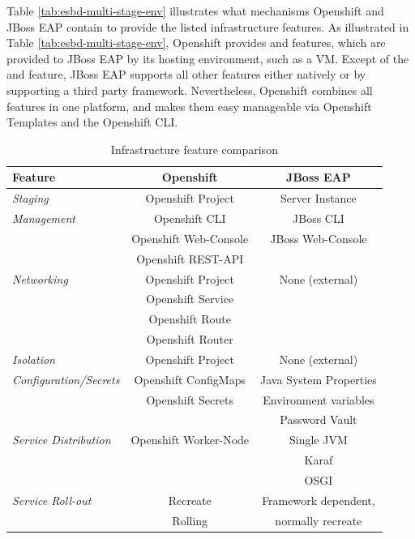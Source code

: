 Table \vref{tab:esbd-multi-stage-env} illustrates what mechanisms Openshift and JBoss EAP contain to provide the listed infrastructure features. As illustrated in Table \vref{tab:esbd-multi-stage-env}, Openshift provides  and  features, which are provided to JBoss EAP by its hosting environment, such as a VM. Except of the  and  feature, JBoss EAP supports all other features either natively or by supporting a third party framework. Nevertheless, Openshift combines all features in one platform, and makes them easy manageable via Openshift Templates and the Openshift CLI.

{\renewcommand{\arraystretch}{1.2}%
\begin{table}[h]
	\begin{tabularx}{\textwidth}{ X|c|c }	
	  \textbf{Feature}              & \textbf{Openshift}      & \textbf{JBoss EAP} \\  \hline
	  \textit{Staging}                  & Openshift Project       & Server Instance \\  \hline
	  \textit{Management}               & Openshift CLI           & JBoss CLI \\
	                                    & Openshift Web-Console   & JBoss Web-Console \\
	                                    & Openshift REST-API      & \\  \hline
	  \textit{Networking}               & Openshift Project       & None (external) \\
	                                    & Openshift Service       & \\  
	                                    & Openshift Route         & \\  \hline
	                                    & Openshift Router        & \\  \hline
	  \textit{Isolation}                & Openshift Project       & None (external) \\  \hline
	  \textit{Configuration/Secrets}    & Openshift ConfigMaps    & Java System Properties  \\
	                                    & Openshift Secrets       & Environment variables \\
	                                                             && Password Vault \\  \hline
	  \textit{Service Distribution}     & Openshift Worker-Node   & Single JVM \\ 
			                                                     && Karaf \\  
			                                                     && OSGI \\  \hline
	  \textit{Service Roll-out}         & Recreate                & Framework dependent, \\ 
			                            & Rolling                 & normally recreate \\
	\end{tabularx}
	\caption{Infrastructure feature comparison}
	\label{tab:esbd-multi-stage-env}
\end{table}}

